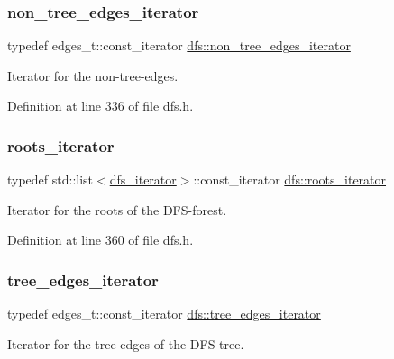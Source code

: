 \subsubsection{\texorpdfstring{non\+\_\+tree\+\_\+edges\+\_\+iterator}{non\_tree\_edges\_iterator}}
{\footnotesize\ttfamily typedef edges\+\_\+t\+::const\+\_\+iterator \mbox{\hyperlink{classdfs_a95e353f354d3b31daded0c4fe749171a}{dfs\+::non\+\_\+tree\+\_\+edges\+\_\+iterator}}}



Iterator for the non-\/tree-\/edges. 



Definition at line 336 of file dfs.\+h.

\mbox{\label{classdfs_a1ea6e8eb2766ac95ac48a8523359065a}} 
\subsubsection{\texorpdfstring{roots\+\_\+iterator}{roots\_iterator}}
{\footnotesize\ttfamily typedef std\+::list$<$\mbox{\hyperlink{classdfs_a15fe023a5a1f7ddda00f3d87110d9a32}{dfs\+\_\+iterator}}$>$\+::const\+\_\+iterator \mbox{\hyperlink{classdfs_a1ea6e8eb2766ac95ac48a8523359065a}{dfs\+::roots\+\_\+iterator}}}



Iterator for the roots of the D\+F\+S-\/forest. 



Definition at line 360 of file dfs.\+h.

\mbox{\label{classdfs_accde8d5403404f6d22fe4756d4ffedd5}} 
\subsubsection{\texorpdfstring{tree\+\_\+edges\+\_\+iterator}{tree\_edges\_iterator}}
{\footnotesize\ttfamily typedef edges\+\_\+t\+::const\+\_\+iterator \mbox{\hyperlink{classdfs_accde8d5403404f6d22fe4756d4ffedd5}{dfs\+::tree\+\_\+edges\+\_\+iterator}}}



Iterator for the tree edges of the D\+F\+S-\/tree. 



